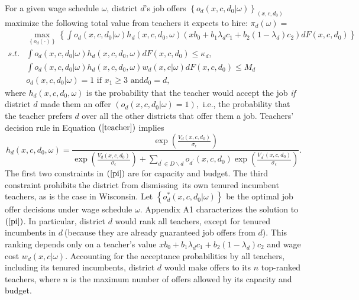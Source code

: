 \documentclass[notitlepage,12pt]{article}%
\begin{document}
For a given wage schedule $\omega$, district $d$'s job offers $\left\{
o_{d}\left(  x,c,d_{0}|\omega\right)  \right\}  _{\left(  x,c,d_{0}\right)  }$
maximize the following total value from teachers it expects to hire:\newline%
$\pi_{d}\left(  \omega\right)  =$%
\begin{align}
&  \max_{\left\{  o_{d}\left(  \cdot\right)  \right\}  }\left\{  \int
o_{d}\left(  x,c,d_{0}|\omega\right)  h_{d}\left(  x,c,d_{0},\omega\right)
\left(  xb_{0}+b_{1}\lambda_{d}c_{1}+b_{2}\left(  1-\lambda_{d}\right)
c_{2}\right)  dF\left(  x,c,d_{0}\right)  \right\} \label{pi}\\
s.t.  &  \int o_{d}\left(  x,c,d_{0}|\omega\right)  h_{d}\left(
x,c,d_{0},\omega\right)  dF\left(  x,c,d_{0}\right)  \leq\kappa_{d}%
,\nonumber\\
&  \int o_{d}\left(  x,c,d_{0}|\omega\right)  h_{d}\left(  x,c,d_{0}%
,\omega\right)  w_{d}\left(  x,c|\omega\right)  dF\left(  x,c,d_{0}\right)
\leq M_{d}\nonumber\\
&  o_{d}\left(  x,c,d_{0}|\omega\right)  =1\text{ if }x_{1}\geq3\text{ and
}d_{0}=d,\nonumber
\end{align}
where $h_{d}\left(  x,c,d_{0},\omega\right)  $ is the probability that the
teacher would accept the job \emph{if} district $d$ made them an offer
$\left(  o_{d}\left(  x,c,d_{0}|\omega\right)  =1\right)  ,$ i.e., the
probability that the teacher prefers $d$ over all the other districts that
offer them a job. Teachers' decision rule in Equation $\left(  \ref{teacher}%
\right)  $ implies
\begin{equation}
h_{d}\left(  x,c,d_{0},\omega\right)  =\frac{\exp\left(  \frac{V_{d}\left(
x,c,d_{0}\right)  }{\sigma_{\epsilon}}\right)  }{\exp\left(  \frac
{V_{d}\left(  x,c,d_{0}\right)  }{\sigma_{\epsilon}}\right)  +\sum_{d^{\prime
}\in D\backslash d}o_{d^{\prime}}\left(  x,c,d_{0}\right)  \exp\left(
\frac{V_{d^{\prime}}\left(  x,c,d_{0}\right)  }{\sigma_{\epsilon}}\right)  }.
\label{accept}%
\end{equation}
The first two constraints in $\left(  \ref{pi}\right)  $ are for capacity and
budget. The third constraint prohibits the district from dismissing\ its own
tenured incumbent teachers, as is the case in Wisconsin. Let $\left\{
o_{d}^{\ast}\left(  x,c,d_{0}|\omega\right)  \right\}  $ be the optimal job
offer decisions under wage schedule $\omega.$ Appendix A1 characterizes the
solution to $\left(  \ref{pi}\right)  $. In particular, district $d$ would
rank all teachers, except for tenured incumbents in $d\ $(because they are
already guaranteed job offers from $d$). This ranking depends only on a
teacher's value $xb_{0}+b_{1}\lambda_{d}c_{1}+b_{2}\left(  1-\lambda
_{d}\right)  c_{2}$ and wage cost $w_{d}\left(  x,c|\omega\right)  $.
Accounting for the acceptance probabilities by all teachers, including its
tenured incumbents, district $d$ would make offers to its $n$ top-ranked
teachers, where $n$ is the maximum number of offers allowed by its capacity
and budget.
\end{document}
